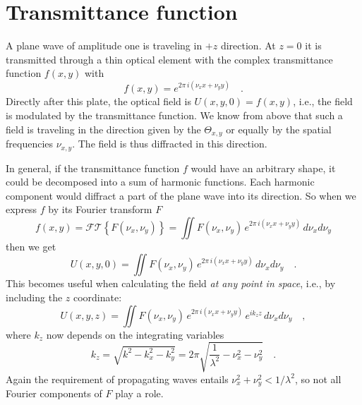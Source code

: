 \section{Transmittance function}

A plane wave of amplitude one is traveling in $+z$ direction. At $z=0$ it is transmitted through a thin optical element with the complex  transmittance function $f(x,y)$ with
\begin{equation}
    f(x,y) =  e^{2 \pi \, i (\nu_x x + \nu_y y) } \quad .
\end{equation}
Directly after this plate, the optical field is $U(x,y,0) = f(x,y)$, i.e., the field is modulated by the transmittance function. We know from above that such a field is traveling in the direction given by the $\Theta_{x,y}$ or equally by the spatial frequencies $\nu_{x,y}$. The field is thus diffracted in this direction.

In general, if the transmittance function $f$ would have an arbitrary shape, it could be decomposed into a sum of harmonic functions. Each harmonic component would diffract a part of the plane wave into its direction. So when we express $f$ by its Fourier transform $F$
\begin{equation}
    f(x,y) = \mathcal{FT} \left\{ F(\nu_x, \nu_y) \right\}
     = \iint F(\nu_x, \nu_y)  \, e^{2 \pi \, i (\nu_x x + \nu_y y) } \, d\nu_x  d\nu_y
\end{equation}
then we get
\begin{equation}
    U(x,y,0) 
     = \iint F(\nu_x, \nu_y)  \, e^{2 \pi \, i (\nu_x x + \nu_y y) } \, d\nu_x  d\nu_y \quad .
\end{equation}
This becomes useful when calculating the field \emph{at any point in space}, i.e., by including the $z$ coordinate:
\begin{equation}
    U(x,y,z) 
     = \iint F(\nu_x, \nu_y)  \, e^{2 \pi \, i (\nu_x x + \nu_y y) } \,e^{i k_z z} \, d\nu_x  d\nu_y \quad ,
     \label{eq:2_Uxyz}
\end{equation}
where $k_z$ now depends on the integrating variables
\begin{equation}
    k_z = \sqrt{k^2 - k_x^2 - k_y^2} = 2 \pi \sqrt{ \frac{1}{\lambda^2} - \nu_x^2 - \nu_y^2 } \quad .
    \label{eq:2_Uxyz_kz}
\end{equation}
Again the requirement of propagating waves entails $\nu_x^2 + \nu_y^2 <  1/\lambda^2$, so not all Fourier components of $F$ play a role.


